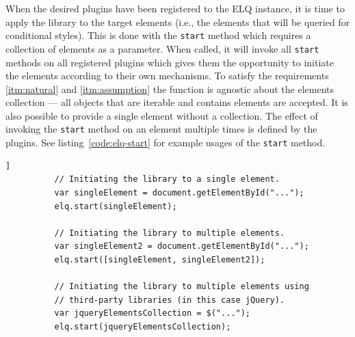 \documentclass[a4paper,11pt]{kth-mag}
\newcommand{\code}[1]{\texttt{#1}}
\newcommand\abbr[2][]{\uppercase{#2}\ifthenelse{\equal{#1}{}}%
                     {}{#1}}
\begin{document}
        When the desired plugins have been registered to the \abbr{elq} instance, it is time to apply the library to the target \glspl{element} (i.e., the elements that will be queried for conditional styles).
        This is done with the \code{start} method which requires a collection of \glspl{element} as a parameter.
        When called, it will invoke all \code{start} methods on all registered plugins which gives them the opportunity to initiate the \glspl{element} according to their own mechanisms.
        To satisfy the requirements \ref{itm:natural} and \ref{itm:assumption} the function is agnostic about the \glspl{element} collection --- all objects that are iterable and contains \glspl{element} are accepted.
        It is also possible to provide a single \gls{element} without a collection.
        The effect of invoking the \code{start} method on an element multiple times is defined by the plugins.
        See listing~\ref{code:elq-start} for example usages of the \code{start} method.
        \begin{lstlisting}[gobble=10,caption={Example usages of the \code{start} method. The method only requires an iterable collection, so it is library agnostic.},captionpos=b,label={code:elq-start}]]
          // Initiating the library to a single element.
          var singleElement = document.getElementById("...");
          elq.start(singleElement);

          // Initiating the library to multiple elements.
          var singleElement2 = document.getElementById("...");
          elq.start([singleElement, singleElement2]);

          // Initiating the library to multiple elements using
          // third-party libraries (in this case jQuery).
          var jqueryElementsCollection = $("...");
          elq.start(jqueryElementsCollection);
        \end{lstlisting}
\end{document}

